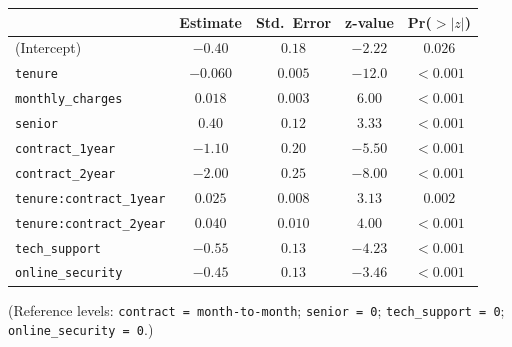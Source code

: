 \documentclass[11pt,a4paper]{article}
\begin{document}
\begin{center}\small
\begin{tabular}{lcccc}
\toprule
 & \textbf{Estimate} & \textbf{Std.\ Error} & \textbf{z-value} & \textbf{Pr($>|z|$)} \\
\midrule
(Intercept)                                          & $-0.40$  & $0.18$    & $-2.22$  & $0.026$  \\
\texttt{tenure}                                      & $-0.060$ & $0.005$   & $-12.0$  & $<0.001$ \\
\texttt{monthly\_charges}                            & $0.018$  & $0.003$   & $6.00$   & $<0.001$ \\
\texttt{senior}                                      & $0.40$   & $0.12$    & $3.33$   & $<0.001$ \\
\texttt{contract\_1year}                             & $-1.10$  & $0.20$    & $-5.50$  & $<0.001$ \\
\texttt{contract\_2year}                             & $-2.00$  & $0.25$    & $-8.00$  & $<0.001$ \\
\texttt{tenure:contract\_1year}                      & $0.025$  & $0.008$   & $3.13$   & $0.002$  \\
\texttt{tenure:contract\_2year}                      & $0.040$  & $0.010$   & $4.00$   & $<0.001$ \\
\texttt{tech\_support}                               & $-0.55$  & $0.13$    & $-4.23$  & $<0.001$ \\
\texttt{online\_security}                            & $-0.45$  & $0.13$    & $-3.46$  & $<0.001$ \\
\bottomrule
\end{tabular}
\end{center}

\noindent (Reference levels: \texttt{contract = month-to-month}; \texttt{senior = 0}; \texttt{tech\_support = 0}; \texttt{online\_security = 0}.)
\end{document}
